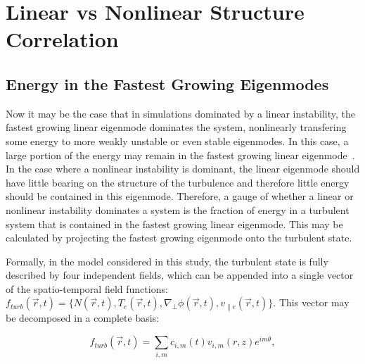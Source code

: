 \documentclass[showpacs,preprintnumbers,amsmath,amssymb,superscriptaddress,aip]{revtex4-1}
\def\beq{\begin{equation}}
\def\eeq{\end{equation}}
\def\grad{\nabla}
\newcommand{\gradperp}{\grad_\perp}
\newcommand{\vpe}{v_{\parallel e}}
\begin{document}
\section{Linear vs Nonlinear Structure Correlation}
\label{Sec_lin_vs_nl}
\subsection{Energy in the Fastest Growing Eigenmodes}
\label{subsec_en_eigenmodes}

Now it may be the case that in simulations dominated by a linear instability, the fastest growing linear
eigenmode dominates the system, nonlinearly transfering some energy to more weakly unstable or even stable eigenmodes. In this case, a large portion of the energy may remain in the fastest
growing linear eigenmode~\cite{hatch2011}. In the case where a nonlinear instability is dominant, the linear eigenmode should have little bearing on the structure of the turbulence and therefore little
energy should be contained in this eigenmode. Therefore, a gauge of whether a linear or nonlinear instability dominates a system is the fraction of energy in a turbulent system
that is contained in the fastest growing linear eigenmode. This may be calculated by projecting the fastest growing eigenmode onto the turbulent state.

Formally, in the model considered in this study, the turbulent state is fully described by four independent fields, which can be appended into a single vector of the spatio-temporal field functions: 
$f_{turb}(\vec{r},t) = \{N(\vec{r},t),T_e(\vec{r},t),\gradperp \phi(\vec{r},t), \vpe(\vec{r},t)\}$. This vector may be decomposed in a complete basis:

\beq
\label{basis_decomp}
f_{turb}(\vec{r},t) = \sum_{i,m} c_{i,m}(t) v_{i,m}(r,z) e^{i m \theta},
\eeq
\end{document}
